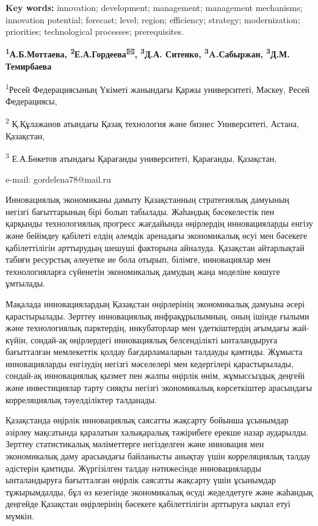 {\bfseries Key words:} innovation; development; management; management
mechanisms; innovation potential; forecast; level; region; efficiency;
strategy; modernization; priorities; technological processes;
prerequisites.


\begin{center}
{\bfseries \textsuperscript{1}А.Б.Моттаева,
\textsuperscript{2}Е.А.Гордеева\textsuperscript{🖂},
\textsuperscript{3}Д.А. Ситенко, \textsuperscript{3}A.Сабыржан,
\textsuperscript{3}Д.М.} {\bfseries Темирбаева}

\textsuperscript{1}Ресей Федерациясының Үкіметі жанындағы Қаржы
университеті, Мәскеу, Ресей Федерациясы,

\textsuperscript{2} Қ.Құлажанов атындағы Қазақ технология және бизнес
Университеті, Астана, Қазақстан,

\textsuperscript{3} Е.А.Бөкетов атындағы Қарағанды университеті,
Қарағанды, Қазақстан,

e-mail: gordelena78@mail.ru
\end{center}

Инновациялық экономиканы дамыту Қазақстанның стратегиялық дамуының
негізгі бағыттарының бірі болып табылады. Жаһандық бәсекелестік пен
қарқынды технологиялық прогресс жағдайында өңірлердің инновацияларды
енгізу және бейімдеу қабілеті елдің әлемдік аренадағы экономикалық өсуі
мен бәсекеге қабілеттілігін арттырудың шешуші факторына айналуда.
Қазақстан айтарлықтай табиғи ресурстық әлеуетке ие бола отырып, білімге,
инновациялар мен технологияларға сүйенетін экономикалық дамудың жаңа
моделіне көшуге ұмтылады.

Мақалада инновациялардың Қазақстан өңірлерінің экономикалық дамуына
әсері қарастырылады. Зерттеу инновациялық инфрақұрылымның, оның ішінде
ғылыми және технологиялық парктердің, инкубаторлар мен үдеткіштердің
ағымдағы жай-күйін, сондай-ақ өңірлердегі инновациялық белсенділікті
ынталандыруға бағытталған мемлекеттік қолдау бағдарламаларын талдауды
қамтиды. Жұмыста инновацияларды енгізудің негізгі мәселелері мен
кедергілері қарастырылады, сондай-ақ инновациялық қызмет пен жалпы
өңірлік өнім, жұмыссыздық деңгейі және инвестициялар тарту сияқты
негізгі экономикалық көрсеткіштер арасындағы корреляциялық тәуелділіктер
талданады.

Қазақстанда өңірлік инновациялық саясатты жақсарту бойынша ұсынымдар
әзірлеу мақсатында қаралатын халықаралық тәжірибеге ерекше назар
аударылды. Зерттеу статистикалық мәліметтерге негізделген және инновация
мен экономикалық даму арасындағы байланысты анықтау үшін корреляциялық
талдау әдістерін қамтиды. Жүргізілген талдау нәтижесінде инновацияларды
ынталандыруға бағытталған өңірлік саясатты жақсарту үшін ұсынымдар
тұжырымдалды, бұл өз кезегінде экономикалық өсуді жеделдетуге және
жаһандық деңгейде Қазақстан өңірлерінің бәсекеге қабілеттілігін
арттыруға ықпал етуі мүмкін.

